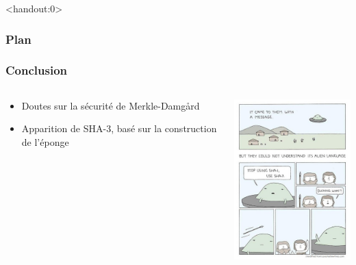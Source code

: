 \begin{frame}<handout:0>
  \frametitle{Plan}
  \tableofcontents[currentsection,subsectionstyle=hide]
\end{frame}

\begin{frame}[fragile]
  \frametitle{Conclusion}

  \begin{minipage}[0.2\textheight]{\textwidth}
    \begin{columns}[T]
      \begin{column}{0.5\textwidth}
        \vspace{2cm}
        \begin{itemize}
        \item{Doutes sur la sécurité de Merkle-Damg\r{a}rd}
          \vspace{1.5cm}
        \item{Apparition de SHA-3, basé sur la construction de l'éponge}
          \vfill
        \end{itemize}
        \vfill
      \end{column}
      \begin{column}{0.5\textwidth}
        \includegraphics[width=5.5cm]{Conclu-Memoire.jpg}
      \end{column}
      \end{columns}
      \end{minipage}
  \vfill
\end{frame}
